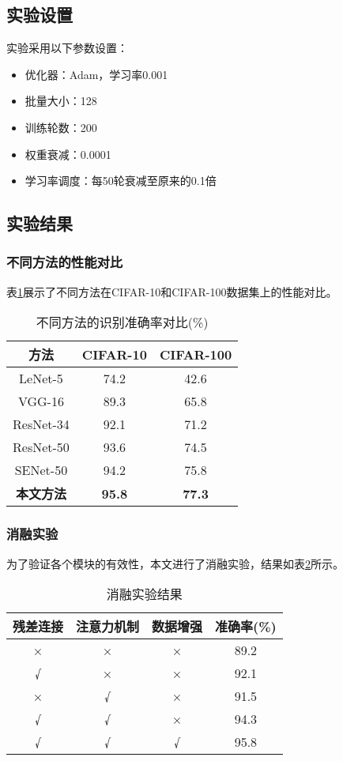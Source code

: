 \documentclass[a4paper,12pt]{article}
\begin{document}
\subsection{实验设置}

实验采用以下参数设置：
\begin{itemize}
    \item 优化器：Adam，学习率0.001
    \item 批量大小：128
    \item 训练轮数：200
    \item 权重衰减：0.0001
    \item 学习率调度：每50轮衰减至原来的0.1倍
\end{itemize}

\subsection{实验结果}

\subsubsection{不同方法的性能对比}

表\ref{tab:comparison}展示了不同方法在CIFAR-10和CIFAR-100数据集上的性能对比。

\begin{table}[htbp]
\centering
\caption{不同方法的识别准确率对比(\%)}
\label{tab:comparison}
\begin{tabular}{ccc}
\toprule
\textbf{方法} & \textbf{CIFAR-10} & \textbf{CIFAR-100} \\
\midrule
LeNet-5 & 74.2 & 42.6 \\
VGG-16 & 89.3 & 65.8 \\
ResNet-34 & 92.1 & 71.2 \\
ResNet-50 & 93.6 & 74.5 \\
SENet-50 & 94.2 & 75.8 \\
\textbf{本文方法} & \textbf{95.8} & \textbf{77.3} \\
\bottomrule
\end{tabular}
\end{table}

\subsubsection{消融实验}

为了验证各个模块的有效性，本文进行了消融实验，结果如表\ref{tab:ablation}所示。

\begin{table}[htbp]
\centering
\caption{消融实验结果}
\label{tab:ablation}
\begin{tabular}{cccc}
\toprule
\textbf{残差连接} & \textbf{注意力机制} & \textbf{数据增强} & \textbf{准确率(\%)} \\
\midrule
× & × & × & 89.2 \\
√ & × & × & 92.1 \\
× & √ & × & 91.5 \\
√ & √ & × & 94.3 \\
√ & √ & √ & 95.8 \\
\bottomrule
\end{tabular}
\end{table}
\end{document}
